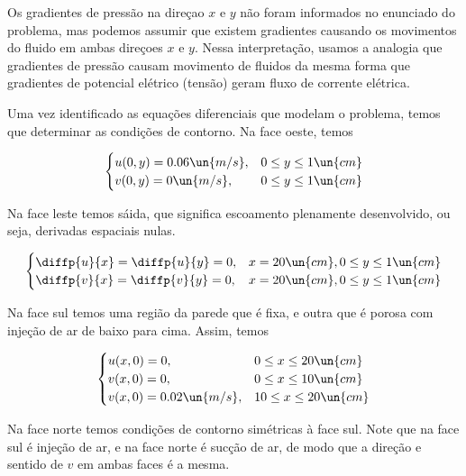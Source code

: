 Os gradientes de pressão na direçao $x$ e $y$
não foram informados no enunciado do problema, mas podemos assumir que existem gradientes 
causando os movimentos do fluido em ambas direçoes $x$ e $y$. Nessa interpretação, usamos a analogia
que gradientes de pressão causam movimento de fluidos da mesma forma que gradientes de potencial
elétrico (tensão) geram fluxo de corrente elétrica. 

Uma vez identificado as equações diferenciais que modelam o problema, temos que determinar
as condições de contorno. Na face oeste, temos

\begin{equation}\label{eq:q4WestBoundary}
    \begin{cases}
        u(0, y) = 0.06 \un{m/s}, & 0 \leq y \leq 1 \un{cm} \\
        v(0, y) = 0 \un{m/s}, & 0 \leq y \leq 1 \un{cm} \\
    \end{cases}
\end{equation}

Na face leste temos sáida, que significa escoamento plenamente
desenvolvido, ou seja, derivadas espaciais nulas.

\begin{equation}\label{eq:q4EastBoundary}
    \begin{cases}
        \diffp{u}{x} = \diffp{u}{y} = 0, & x = 20 \un{cm}, 0 \leq y \leq 1 \un{cm}  \\
        \diffp{v}{x} = \diffp{v}{y} = 0, & x = 20 \un{cm}, 0 \leq y \leq 1 \un{cm} \\
    \end{cases}
\end{equation}

Na face sul temos uma região da parede que é fixa, e outra que é porosa com injeção
de ar de baixo para cima. Assim, temos

\begin{equation}\label{eq:q4SouthBoundary}
    \begin{cases}
        u(x, 0) = 0, & 0 \leq x \leq 20 \un{cm}  \\
        v(x, 0) = 0, & 0 \leq x \leq 10 \un{cm}  \\
        v(x, 0) = 0.02 \un{m/s}, & 10 \leq x \leq 20 \un{cm}  \\
    \end{cases}
\end{equation}

Na face norte temos condições de contorno simétricas à face sul. Note que na face
sul é injeção de ar, e na face norte é sucção de ar, de modo que a direção e sentido
de $v$ em ambas faces é a mesma.

